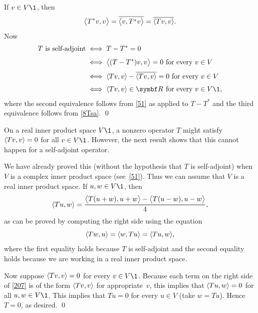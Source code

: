 
\proof
If $v \in V\1$, then
\begin{equation} \label{8Tsa}
\ip[\big]{T^*v, v} = \overline{\ip[\big]{v, T^*v}} = \overline{\ip{Tv, v}}.
\end{equation}
Now
\begin{align*}
T \text{ is self-adjoint} &\iff T - T^* = 0 \\[3bp]
&\iff \ip[\big]{ (T - T^*)v, v} = 0 \text{ for every } v \in V \\[3bp]
&\iff \ip{Tv, v} - \overline{\ip{Tv, v}} = 0  \text{ for every } v \in V \\[3bp]
&\iff \ip{Tv, v} \in \R{}  \text{ for every } v \in V\1,
\end{align*}
where the second equivalence follows from \ref{51} as applied to $T - T^*$ and the third equivalence follows from \ref{8Tsa}.
\qed

On a real inner product space $V\1$, a nonzero operator $T$ might satisfy
$\ip{Tv, v} = 0$ for all $v \in V\1$.  However, the next result shows that this
cannot happen for a self-adjoint operator.


\proof
We have already proved this (without the hypothesis that $T$ is self-adjoint) when
$V$ is a complex inner product space (see~\ref{51}).  Thus we can assume that
$V$ is a real inner product space.
If $u, w \in V\1$, then
\begin{equation} \label{207}
\ip{Tu, w} = \frac{ \ip[\big]{T(u+w), u+w} -\ip[\big]{T(u-w), u-w}}{4},
\end{equation}%
as can be proved by computing the right side using the equation
\[
\ip{Tw, u} = \ip{w, Tu}
= \ip{Tu, w},
\]
where the first equality holds because $T$ is self-adjoint and the second
equality holds because we are working in a real inner product space.

Now suppose $\ip{Tv, v} = 0$ for every $v \in V\1$. Because each term on the right side of \ref{207} is of the form $\ip{Tv, v}$ for appropriate~$v$, this implies that $\ip{Tu, w} = 0$ for all $u, w \in V\1$.  This implies that $Tu = 0$ for every $u \in V$ (take $w = Tu$). Hence $T = 0$, as desired.
\qed

